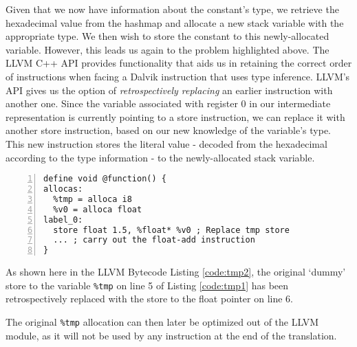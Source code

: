 Given that we now have information about the constant's type, we retrieve the hexadecimal value from the hashmap and allocate a new stack variable with the appropriate type. We then wish to store the constant to this newly-allocated variable. However, this leads us again to the problem highlighted above. The LLVM C++ API provides functionality that aids us in retaining the correct order of instructions when facing a Dalvik instruction that uses type inference. LLVM's API gives us the option of \textit{retrospectively replacing} an earlier instruction with another one. Since the variable associated with register 0 in our intermediate representation is currently pointing to a store instruction, we can replace it with another store instruction, based on our new knowledge of the variable's type. This new instruction stores the literal value - decoded from the hexadecimal according to the type information - to the newly-allocated stack variable.

\begin{lstlisting}[frame=single, numbers=left, numberstyle=\tiny, caption={LLVM bytecode}, label=code:tmp2]
define void @function() {
allocas:
  %tmp = alloca i8
  %v0 = alloca float
label_0:
  store float 1.5, %float* %v0 ; Replace tmp store
  ... ; carry out the float-add instruction
}
\end{lstlisting}

As shown here in the LLVM Bytecode Listing \ref{code:tmp2}, the original `dummy' store to the variable \verb|%tmp| on line 5 of Listing \ref{code:tmp1} has been retrospectively replaced with the store to the float pointer on line 6.

The original \verb|%tmp| allocation can then later be optimized out of the LLVM module, as it will not be used by any instruction at the end of the translation.
